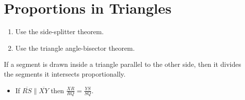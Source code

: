 \documentclass{article}
\begin{document}
\section*{Proportions in Triangles}

\begin{tcolorbox}[colframe=orange!70!white, coltitle=black, title=\textbf{Today I Can}]
\begin{enumerate}
    \item Use the side-splitter theorem.
    \item Use the triangle angle-bisector theorem.
\end{enumerate}
\end{tcolorbox}
\smallskip

\begin{tcolorbox}[colframe=black!20!white, opacitybacktitle=0.1, coltitle=black, title=\textbf{Side-Splitter Theorem}]
If a segment is drawn inside a triangle parallel to the other side, then it divides the segments it intersects proportionally. \newline 

\begin{minipage}{0.4\textwidth}
\begin{itemize}
    \item If $\overline{RS} \parallel \overline{XY}$ then $\frac{XR}{RQ} = \frac{YS}{SQ}$. 
\end{itemize}
\end{minipage}
\begin{minipage}{0.5\textwidth}
\end{minipage}
\end{tcolorbox}
\smallskip 
\end{document}
